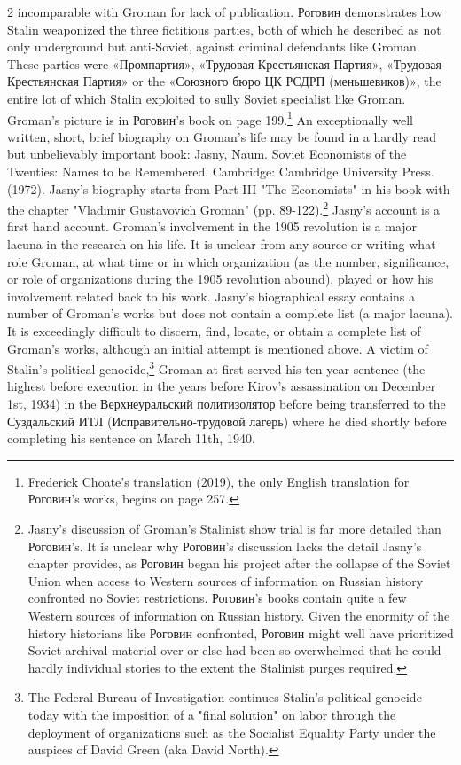 \documentclass[10pt,a4paper,twoside]{article} %
\begin{document}
\begin{multicols}{2}
{incomparable with Groman for lack of publication. \textrussian{Роговин} demonstrates how Stalin weaponized the three fictitious parties, both of which he described as not only underground but anti-Soviet, against criminal defendants like Groman. These parties were \textrussian{«Промпартия»}, \textrussian{«Трудовая Крестьянская Партия»}, \textrussian{«Трудовая Крестьянская Партия»} or the \textrussian{«Союзного бюро ЦК РСДРП (меньшевиков)»}, the entire lot of which Stalin exploited to sully Soviet specialist like Groman. Groman's picture is in \textrussian{Роговин}'s book on page 199.\footnote{Frederick Choate's translation (2019), the only English translation for \textrussian{Роговин}'s works, begins on page 257.} An exceptionally well written, short, brief biography on Groman's life may be found in a hardly read but unbelievably important book: Jasny, Naum. Soviet Economists of the Twenties: Names to be Remembered. Cambridge: Cambridge University Press. (1972). Jasny's biography starts from Part III "The Economists" in his book with the chapter "Vladimir Gustavovich Groman" (pp. 89-122).\footnote{Jasny's discussion of Groman's Stalinist show trial is far more detailed than \textrussian{Роговин}'s. It is unclear why \textrussian{Роговин}'s discussion lacks the detail Jasny's chapter provides, as \textrussian{Роговин} began his project after the collapse of the Soviet Union when access to Western sources of information on Russian history confronted no Soviet restrictions. \textrussian{Роговин}'s books contain quite a few Western sources of information on Russian history. Given the enormity of the history historians like \textrussian{Роговин} confronted, \textrussian{Роговин} might well have prioritized Soviet archival material over or else had been so overwhelmed that he could hardly individual stories to the extent the Stalinist purges required.} Jasny's account is a first hand account. Groman's involvement in the 1905 revolution is a major lacuna in the research on his life. It is unclear from any source or writing what role Groman, at what time or in which organization (as the number, significance, or role of organizations during the 1905 revolution abound), played or how his involvement related back to his work. Jasny's biographical essay contains a number of Groman's works but does not contain a complete list (a major lacuna). It is exceedingly difficult to discern, find, locate, or obtain a complete list of Groman's works, although an initial attempt is mentioned above. A victim of Stalin's political genocide,\footnote{The Federal Bureau of Investigation continues Stalin's political genocide today with the imposition of a "final solution" on labor through the deployment of organizations such as the Socialist Equality Party under the auspices of David Green (aka David North).} Groman at first served his ten year sentence (the highest before execution in the years before Kirov's assassination on December 1st, 1934) in the \textrussian{Верхнеуральский политизолятор} before being transferred to the \textrussian{Суздальский ИТЛ (Исправительно-трудовой лагерь)} where he died shortly before completing his sentence on March 11th, 1940.}



\end{multicols}
\end{document}
